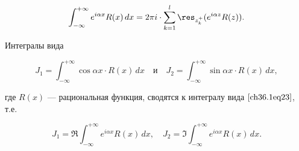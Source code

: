 \begin{equation} \label{ch36.1eq27}
\int_{-\infty}^{+\infty} e^{i \alpha x}R(x) \,dx = 2\pi i \cdot \sum_{k = 1}^l \res_{z_k^+} (e^{i \alpha z}R(z)).
\end{equation}

\begin{cons} \label{ch36.1cons2}
Интегралы вида

\begin{equation} \label{ch36.1eq28}
J_1 = \int_{-\infty}^{+\infty} \cos\alpha x \cdot R(x) \,dx \quad \text{и} \quad J_2 = \int_{-\infty}^{+\infty} \sin \alpha x \cdot R(x) \,dx,
\end{equation}

где $R(x)$ --- рациональная функция, сводятся к интегралу вида $\eqref{ch36.1eq23}$, т.е.

$$
J_1 = \Re \int_{-\infty}^{+\infty} e^{i \alpha x} R(x) \,dx, \quad J_2 = \Im \int_{-\infty}^{+\infty} e^{i \alpha x}R(x) \,dx.
$$
\end{cons}
